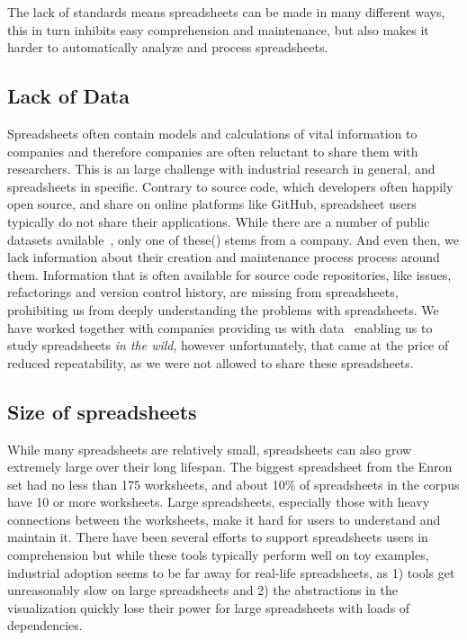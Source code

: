 \documentclass[conference]{IEEEtran}
\begin{document}
The lack of standards means spreadsheets can be made in many different ways, this in turn inhibits easy comprehension and maintenance, but also makes it harder to automatically analyze and process spreadsheets.

\subsection{Lack of Data}
Spreadsheets often contain models and calculations of vital information to companies and therefore companies are often reluctant to share them with researchers. This is an large challenge with industrial research in general, and spreadsheets in specific. Contrary to source code, which developers often happily open source, and share on online platforms like GitHub, spreadsheet users typically do not share their applications. While there are a number of public datasets available~\cite{fisher_euses_2005, Hermans2015, conf/msr/BarikLSSM15}, only one of these(\cite{Hermans2015}) stems from a company. And even then, we lack information about their creation and maintenance process process around them. Information that is often available for source code repositories, like issues, refactorings and version control history, are missing from spreadsheets, prohibiting us from deeply understanding the problems with spreadsheets. We have worked together with companies providing us with data~\cite{hermans_supporting_2011, hermans_detecting_2012, hermans_detecting_2012-1, hermans_detecting_2014, Jansen2015} enabling us to study spreadsheets \emph{in the wild}, however unfortunately, that came at the price of reduced repeatability, as we were not allowed to share these spreadsheets.

\subsection{Size of spreadsheets}
While many spreadsheets are relatively small, spreadsheets can also grow extremely large over their long lifespan. The biggest spreadsheet from the Enron set had no less than 175 worksheets, and about 10\% of spreadsheets in the corpus have 10 or more worksheets. Large spreadsheets, especially those with heavy connections between the worksheets, make it hard for users to  understand and maintain it. There have been several efforts to support spreadsheets users in comprehension  but while these tools typically perform well on toy examples, industrial adoption seems to be far away for real-life spreadsheets, as 1) tools get unreasonably slow on large spreadsheets and 2) the abstractions in the visualization quickly lose their power for large spreadsheets with loads of dependencies. 
\end{document}
